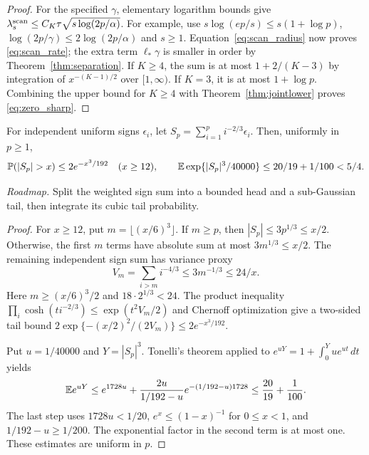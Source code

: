 \begin{proof}
For the specified $\gamma$, elementary logarithm bounds give
$\lambda_s^{\rm scan}\le C_K\tau\sqrt{s\log(2p/\alpha)}$.
For example, use $s\log(ep/s)\le s(1+\log p)$,
$\log(2p/\gamma)\le2\log(2p/\alpha)$ and $s\ge1$.
Equation~\eqref{eq:scan_radius} now proves \eqref{eq:scan_rate}; the extra term $\ell_*\gamma$ is smaller in order by Theorem~\ref{thm:separation}.
If $K\ge4$, the sum is at most $1+2/(K-3)$ by integration of $x^{-(K-1)/2}$ over $[1,\infty)$. If $K=3$, it is at most $1+\log p$. Combining the upper bound for $K\ge4$ with Theorem~\ref{thm:jointlower} proves \eqref{eq:zero_sharp}.
\end{proof}

\begin{lemma}\label{lem:cubic_moment}
For independent uniform signs $\epsilon_i$, let
$S_p=\sum_{i=1}^p i^{-2/3}\epsilon_i$. Then, uniformly in $p\ge1$,
\[
 \PP(|S_p|>x)\le2e^{-x^3/192}\quad(x\ge12),
 \qquad
 \E\exp\{|S_p|^3/40000\}\le20/19+1/100<5/4.
\]
\end{lemma}
\noindent\emph{Roadmap.} Split the weighted sign sum into a bounded head and a sub-Gaussian tail, then integrate its cubic tail probability.
\begin{proof}
For $x\ge12$, put $m=\lfloor(x/6)^3\rfloor$. If $m\ge p$, then
$|S_p|\le3p^{1/3}\le x/2$.
Otherwise, the first $m$ terms have absolute sum at most
$3m^{1/3}\le x/2$. The remaining independent sign sum has variance proxy
\[
 V_m=\sum_{i>m}i^{-4/3}\le3m^{-1/3}\le24/x.
\]
Here $m\ge(x/6)^3/2$ and $18\cdot2^{1/3}<24$.
The product inequality $\prod_i\cosh(ti^{-2/3})\le\exp(t^2V_m/2)$
and Chernoff optimization give a two-sided tail bound
$2\exp\{-(x/2)^2/(2V_m)\}\le2e^{-x^3/192}$.

Put $u=1/40000$ and $Y=|S_p|^3$. Tonelli's theorem applied to
$e^{uY}=1+\int_0^Y ue^{ut}\,dt$ yields
\[
 \mathbb E e^{uY}
 \le e^{1728u}
 +\frac{2u}{1/192-u}
       e^{-(1/192-u)1728}
 \le \frac{20}{19}+\frac1{100}.
\]
The last step uses $1728u<1/20$, $e^x\le(1-x)^{-1}$ for $0\le x<1$,
and $1/192-u\ge1/200$. The exponential factor in the second term is at most one. These estimates are uniform in $p$.
\end{proof}

